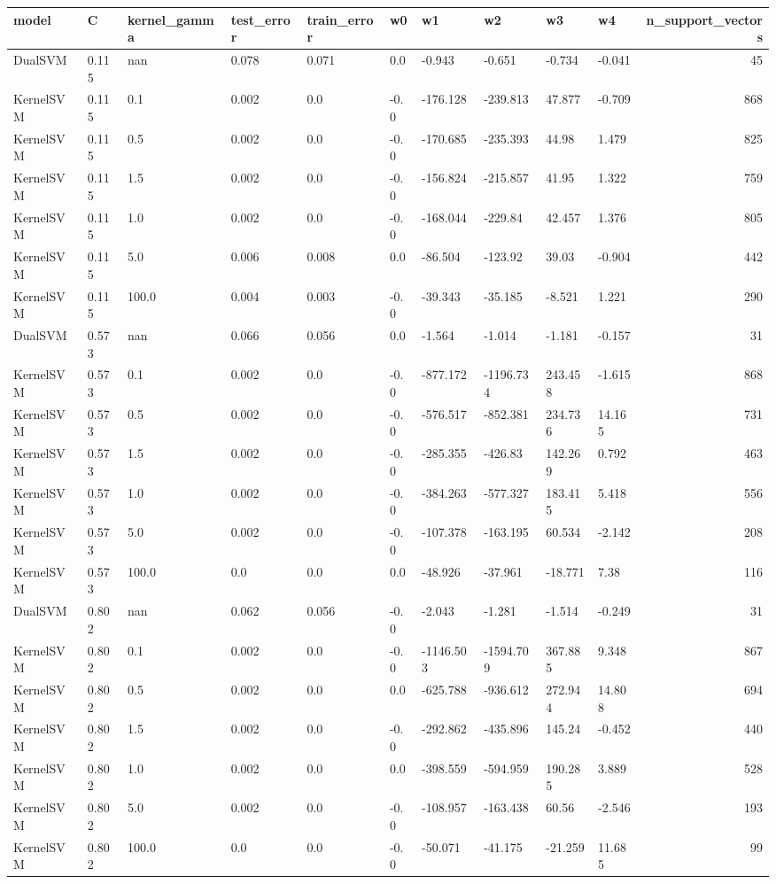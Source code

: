 \begin{tabular}{llllllllllr}
\toprule
model & C & kernel_gamma & test_error & train_error & w0 & w1 & w2 & w3 & w4 & n_support_vectors \\
\midrule
DualSVM & 0.115 & nan & 0.078 & 0.071 & 0.0 & -0.943 & -0.651 & -0.734 & -0.041 & 45 \\
KernelSVM & 0.115 & 0.1 & 0.002 & 0.0 & -0.0 & -176.128 & -239.813 & 47.877 & -0.709 & 868 \\
KernelSVM & 0.115 & 0.5 & 0.002 & 0.0 & -0.0 & -170.685 & -235.393 & 44.98 & 1.479 & 825 \\
KernelSVM & 0.115 & 1.5 & 0.002 & 0.0 & -0.0 & -156.824 & -215.857 & 41.95 & 1.322 & 759 \\
KernelSVM & 0.115 & 1.0 & 0.002 & 0.0 & -0.0 & -168.044 & -229.84 & 42.457 & 1.376 & 805 \\
KernelSVM & 0.115 & 5.0 & 0.006 & 0.008 & 0.0 & -86.504 & -123.92 & 39.03 & -0.904 & 442 \\
KernelSVM & 0.115 & 100.0 & 0.004 & 0.003 & -0.0 & -39.343 & -35.185 & -8.521 & 1.221 & 290 \\
DualSVM & 0.573 & nan & 0.066 & 0.056 & 0.0 & -1.564 & -1.014 & -1.181 & -0.157 & 31 \\
KernelSVM & 0.573 & 0.1 & 0.002 & 0.0 & -0.0 & -877.172 & -1196.734 & 243.458 & -1.615 & 868 \\
KernelSVM & 0.573 & 0.5 & 0.002 & 0.0 & -0.0 & -576.517 & -852.381 & 234.736 & 14.165 & 731 \\
KernelSVM & 0.573 & 1.5 & 0.002 & 0.0 & -0.0 & -285.355 & -426.83 & 142.269 & 0.792 & 463 \\
KernelSVM & 0.573 & 1.0 & 0.002 & 0.0 & -0.0 & -384.263 & -577.327 & 183.415 & 5.418 & 556 \\
KernelSVM & 0.573 & 5.0 & 0.002 & 0.0 & -0.0 & -107.378 & -163.195 & 60.534 & -2.142 & 208 \\
KernelSVM & 0.573 & 100.0 & 0.0 & 0.0 & 0.0 & -48.926 & -37.961 & -18.771 & 7.38 & 116 \\
DualSVM & 0.802 & nan & 0.062 & 0.056 & -0.0 & -2.043 & -1.281 & -1.514 & -0.249 & 31 \\
KernelSVM & 0.802 & 0.1 & 0.002 & 0.0 & -0.0 & -1146.503 & -1594.709 & 367.885 & 9.348 & 867 \\
KernelSVM & 0.802 & 0.5 & 0.002 & 0.0 & 0.0 & -625.788 & -936.612 & 272.944 & 14.808 & 694 \\
KernelSVM & 0.802 & 1.5 & 0.002 & 0.0 & -0.0 & -292.862 & -435.896 & 145.24 & -0.452 & 440 \\
KernelSVM & 0.802 & 1.0 & 0.002 & 0.0 & 0.0 & -398.559 & -594.959 & 190.285 & 3.889 & 528 \\
KernelSVM & 0.802 & 5.0 & 0.002 & 0.0 & -0.0 & -108.957 & -163.438 & 60.56 & -2.546 & 193 \\
KernelSVM & 0.802 & 100.0 & 0.0 & 0.0 & -0.0 & -50.071 & -41.175 & -21.259 & 11.685 & 99 \\
\bottomrule
\end{tabular}
